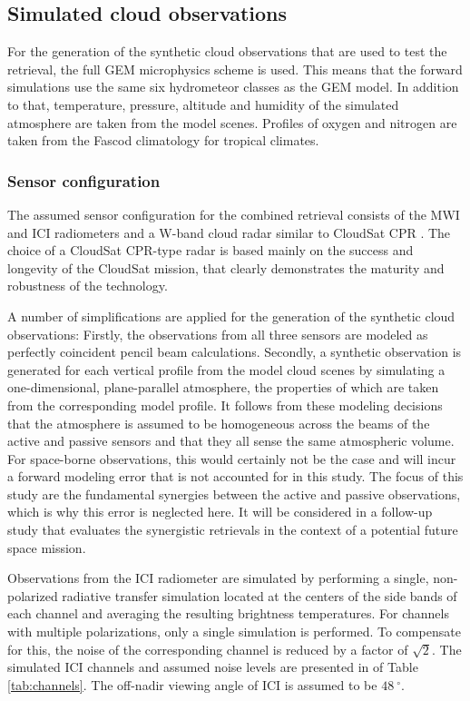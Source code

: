 \documentclass[journal abbreviation, manuscript]{copernicus}
\begin{document}
\subsection{Simulated cloud observations}

For the generation of the synthetic cloud observations that are used to test the
retrieval, the full GEM microphysics scheme is used. This means that the forward
simulations use the same six hydrometeor classes as the GEM model. In addition to
that, temperature, pressure, altitude and humidity of the simulated atmosphere
are taken from the model scenes. Profiles of oxygen and nitrogen are taken from
the Fascod climatology for tropical climates.

\subsubsection{Sensor configuration}
\label{sec:sensors}

The assumed sensor configuration for the combined retrieval consists of the
MWI and ICI radiometers and a W-band cloud radar similar to CloudSat CPR
\citep{stephens02,tanelli08}. The choice of a CloudSat CPR-type radar is based
mainly on the success and longevity of the CloudSat mission, that clearly
demonstrates the maturity and robustness of the technology.

A number of simplifications are applied for the generation of the synthetic
cloud observations: Firstly, the observations from all three sensors are modeled
as perfectly coincident pencil beam calculations. Secondly, a synthetic
observation is generated for each vertical profile from the model cloud scenes
by simulating a one-dimensional, plane-parallel atmosphere, the properties of
which are taken from the corresponding model profile. It follows from these
modeling decisions that the atmosphere is assumed to be homogeneous across the
beams of the active and passive sensors and that they all sense the same
atmospheric volume. For space-borne observations, this would certainly not be
the case and will incur a forward modeling error that is not accounted for in
this study. The focus of this study are the fundamental synergies between the
active and passive observations, which is why this error is neglected here. It
will be considered in a follow-up study that evaluates the synergistic
retrievals in the context of a potential future space mission.

Observations from the ICI radiometer are simulated by performing a single,
non-polarized radiative transfer simulation located at the centers of the side
bands of each channel and averaging the resulting brightness temperatures. For
channels with multiple polarizations, only a single simulation is performed.
To compensate for this, the noise of the corresponding channel is reduced by a
factor of $\sqrt{2}$. The simulated ICI channels and assumed noise levels are
presented in  of Table \ref{tab:channels}. The off-nadir viewing angle of ICI
is assumed to be $48\ \unit{^\circ}$.
\end{document}
